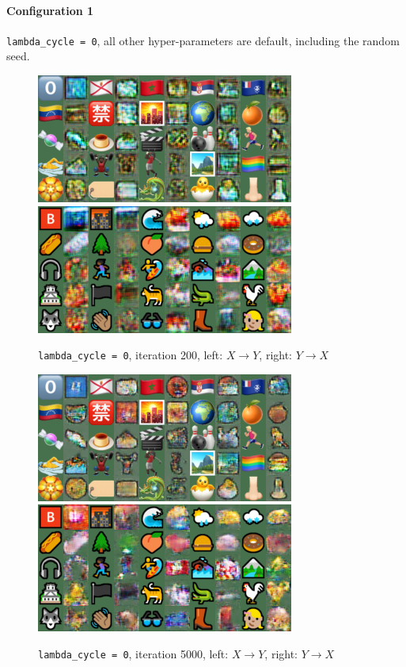 \documentclass{article}
\begin{document}
	\paragraph{Configuration 1} \texttt{lambda\_cycle = 0}, all other hyper-parameters are default, including the random seed.
	\begin{figure}[H]
		\centering
		\caption{ \texttt{lambda\_cycle = 0}, iteration 200, left: $X \to Y$, right: $Y \to X$}
		\includegraphics[width=0.45\linewidth]{./samples_cyclegan_Q3_lambda0/sample-000200-X-Y.png}
		\includegraphics[width=0.45\linewidth]{./samples_cyclegan_Q3_lambda0/sample-000200-Y-X.png}
	\end{figure}
	\begin{figure}[H]
		\centering
		\caption{ \texttt{lambda\_cycle = 0}, iteration 5000, left: $X \to Y$, right: $Y \to X$}
		\includegraphics[width=0.45\linewidth]{./samples_cyclegan_Q3_lambda0/sample-005000-X-Y.png}
		\includegraphics[width=0.45\linewidth]{./samples_cyclegan_Q3_lambda0/sample-005000-Y-X.png}
	\end{figure}
\end{document}
